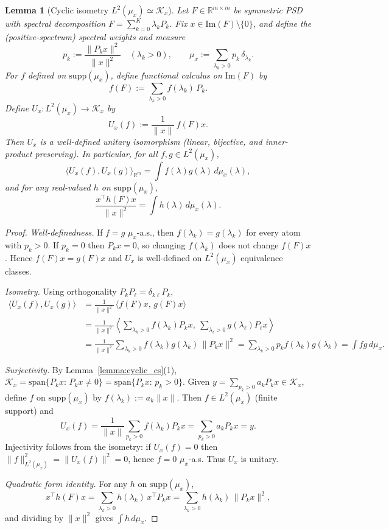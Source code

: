 \documentclass{article}
\theoremstyle{plain}
\newtheorem{lemma}{Lemma}[section]
\numberwithin{equation}{section}
\theoremstyle{definition}
\theoremstyle{remark}
\begin{document}
\begin{lemmaproofbox}
\begin{lemma}[Cyclic isometry $L^2(\mu_x)\simeq \mathcal{K}_x$]
\label{lemma:cyclic_isometry}
Let $F\in\mathbb{R}^{m\times m}$ be symmetric PSD with spectral decomposition $F=\sum_{k=0}^K \lambda_k P_k$.
Fix $x\in\mathrm{Im}(F)\setminus\{0\}$, and define the (positive-spectrum) spectral weights and measure
\[
p_k:=\frac{\|P_kx\|^2}{\|x\|^2}\quad(\lambda_k>0),
\qquad
\mu_x:=\sum_{\lambda_k>0} p_k\,\delta_{\lambda_k}.
\]
For $f$ defined on $\mathrm{supp}(\mu_x)$, define functional calculus on $\mathrm{Im}(F)$ by
\[
f(F):=\sum_{\lambda_k>0} f(\lambda_k)\,P_k.
\]
Define $U_x:L^2(\mu_x)\to \mathcal{K}_x$ by
\[
U_x(f):=\frac{1}{\|x\|}\,f(F)x.
\]
Then $U_x$ is a well-defined unitary isomorphism (linear, bijective, and inner-product preserving). In particular, for
all $f,g\in L^2(\mu_x)$,
\[
\langle U_x(f),U_x(g)\rangle_{\mathbb{R}^m}=\int f(\lambda)g(\lambda)\,d\mu_x(\lambda),
\]
and for any real-valued $h$ on $\mathrm{supp}(\mu_x)$,
\[
\frac{x^\top h(F)x}{\|x\|^2}=\int h(\lambda)\,d\mu_x(\lambda).
\]
\end{lemma}

\begin{proof}
\emph{Well-definedness.} If $f=g$ $\mu_x$-a.s., then $f(\lambda_k)=g(\lambda_k)$ for every atom with $p_k>0$.
If $p_k=0$ then $P_kx=0$, so changing $f(\lambda_k)$ does not change $f(F)x$. Hence $f(F)x=g(F)x$ and $U_x$ is
well-defined on $L^2(\mu_x)$ equivalence classes.

\emph{Isometry.} Using orthogonality $P_kP_\ell=\delta_{k\ell}P_k$,
\begin{align*}
\langle U_x(f),U_x(g)\rangle
&=\frac{1}{\|x\|^2}\,\langle f(F)x,\,g(F)x\rangle \\
&=\frac{1}{\|x\|^2}\left\langle \sum_{\lambda_k>0} f(\lambda_k)P_kx,\ \sum_{\lambda_\ell>0} g(\lambda_\ell)P_\ell x\right\rangle \\
&=\frac{1}{\|x\|^2}\sum_{\lambda_k>0} f(\lambda_k)g(\lambda_k)\,\|P_kx\|^2
=\sum_{\lambda_k>0} p_k f(\lambda_k)g(\lambda_k)
=\int f g\,d\mu_x.
\end{align*}

\emph{Surjectivity.} By Lemma~\ref{lemma:cyclic_cs}(1), $\mathcal{K}_x=\mathrm{span}\{P_kx:\,P_kx\neq 0\}
=\mathrm{span}\{P_kx:\,p_k>0\}$. Given $y=\sum_{p_k>0} a_k P_kx\in\mathcal{K}_x$, define $f$ on $\mathrm{supp}(\mu_x)$ by
$f(\lambda_k):=a_k\|x\|$. Then $f\in L^2(\mu_x)$ (finite support) and
\[
U_x(f)=\frac{1}{\|x\|}\sum_{p_k>0} f(\lambda_k)P_kx=\sum_{p_k>0} a_k P_kx=y.
\]
Injectivity follows from the isometry: if $U_x(f)=0$ then $\|f\|_{L^2(\mu_x)}^2=\|U_x(f)\|^2=0$, hence $f=0$ $\mu_x$-a.s.
Thus $U_x$ is unitary.

\emph{Quadratic form identity.} For any $h$ on $\mathrm{supp}(\mu_x)$,
\[
x^\top h(F)x=\sum_{\lambda_k>0} h(\lambda_k)\,x^\top P_kx
=\sum_{\lambda_k>0} h(\lambda_k)\,\|P_kx\|^2,
\]
and dividing by $\|x\|^2$ gives $\int h\,d\mu_x$.
\end{proof}
\end{lemmaproofbox}
\end{document}
